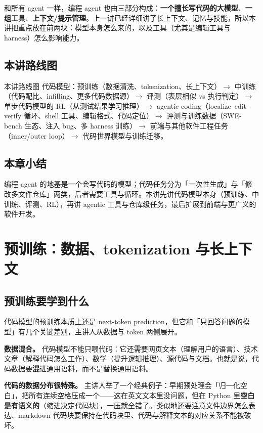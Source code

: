 ﻿\documentclass[a4paper]{article}
\begin{document}
和所有 agent 一样，编程 agent 也由三部分构成：\textbf{一个擅长写代码的大模型}、\textbf{一组工具}、\textbf{上下文/提示管理}。上一讲已经详细讲了长上下文、记忆与技能，所以本讲把重点放在前两块：模型本身怎么来的，以及工具（尤其是编辑工具与 harness）怎么影响能力。

\subsection{本讲路线图}

\begin{knowledgebox}{本讲路线图}
代码模型：预训练（数据清洗、tokenization、长上下文）$\rightarrow$ 中训练（代码配比、infilling、更多代码数据源）$\rightarrow$ 评测（表层相似 vs 执行判定）$\rightarrow$ 单步代码模型的 RL（从测试结果学习推理）$\rightarrow$ agentic coding（localize--edit--verify 循环、shell 工具、编辑格式、代码定位）$\rightarrow$ 评测与训练数据（SWE-bench 生态、注入 bug、多 harness 训练）$\rightarrow$ 前端与其他软件工程任务（inner/outer loop）$\rightarrow$ 代码世界模型与训练迁移。
\end{knowledgebox}

\subsection{本章小结}
编程 agent 的地基是一个会写代码的模型；代码任务分为「一次性生成」与「修改多文件仓库」两类，后者需要工具与循环。本讲先讲代码模型本身（预训练、中训练、评测、RL），再讲 agentic 工具与仓库级任务，最后扩展到前端与更广义的软件开发。

\section{预训练：数据、tokenization 与长上下文}

\subsection{预训练要学到什么}

代码模型的预训练本质上还是 next-token prediction，但它和「只回答问题的模型」有几个关键差别，主讲人从数据与 token 两侧展开。

\textbf{数据混合。} 代码模型不能只喂代码：它还需要网页文本（理解用户的语言）、技术文章（解释代码怎么工作）、数学（提升逻辑推理）、源代码与文档。也就是说，代码数据要\textbf{混}进通用语料，而不是替换通用语料。

\textbf{代码的数据分布很特殊。} 主讲人举了一个经典例子：早期预处理会「归一化空白」，把所有连续空格压成一个——这在英文文本里没问题，但在 Python 里\textbf{空白是有语义的}（缩进决定代码块），一压就全错了。类似地还要注意文件边界怎么表达、markdown 代码块要保持在代码块里、代码与解释文本的对应关系不能被破坏。
\end{document}
